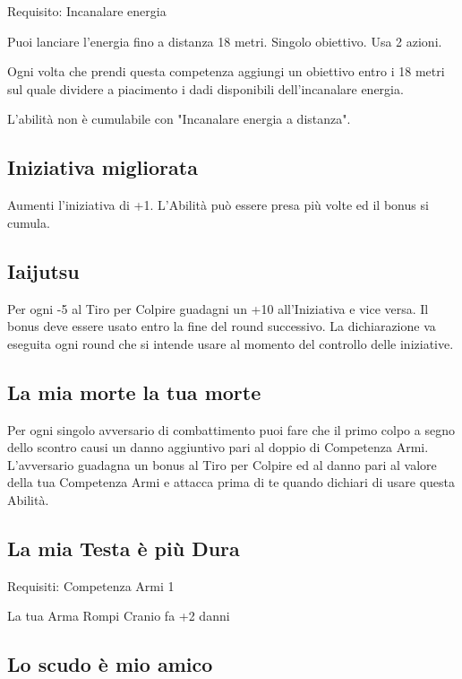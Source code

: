 \documentclass[a4paper,11pt,twoside,openany]{book}
\begin{document}
Requisito: Incanalare energia

Puoi lanciare l'energia fino a distanza 18 metri. Singolo obiettivo. Usa 2 azioni.

Ogni volta che prendi questa competenza aggiungi un obiettivo entro i 18 metri sul quale dividere a piacimento i dadi disponibili dell'incanalare energia.

L'abilità non è cumulabile con "Incanalare energia a distanza".

\subsection{Iniziativa migliorata}

Aumenti l'iniziativa di +1. L'Abilità può essere presa più volte ed il bonus si cumula.

\subsection{Iaijutsu}

Per ogni -5 al Tiro per Colpire guadagni un +10 all'Iniziativa e vice versa.
Il bonus deve essere usato entro la fine del round successivo. La dichiarazione va eseguita ogni round che si intende usare al momento del controllo delle iniziative.

\subsection{La mia morte la tua morte}

Per ogni singolo avversario di combattimento puoi fare che il primo colpo a segno dello scontro causi un danno aggiuntivo pari al doppio di Competenza Armi. L'avversario guadagna un bonus al Tiro per Colpire ed al danno pari al valore della tua Competenza Armi e attacca prima di te quando dichiari di usare questa Abilità.

\subsection{La mia Testa è più Dura}

Requisiti: Competenza Armi 1

La tua Arma Rompi Cranio fa +2 danni

\subsection{Lo scudo è mio amico}
\end{document}
